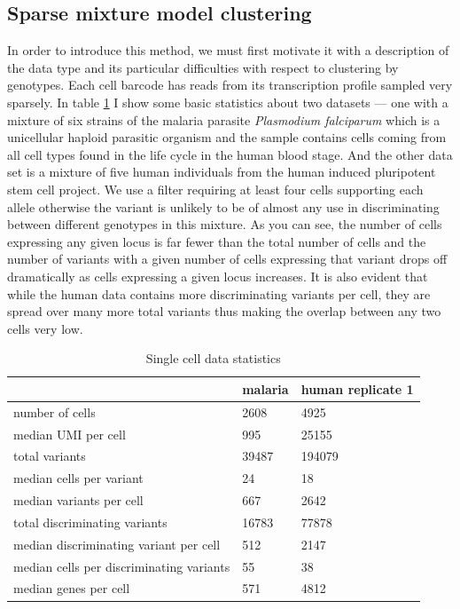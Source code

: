 \subsection{Sparse mixture model clustering}
\par{
In order to introduce this method, we must first motivate it with a description of the data type and its particular difficulties with respect to clustering by genotypes. Each cell barcode has reads from its transcription profile sampled very sparsely. In table \ref{table:scdatatable} I show some basic statistics about two datasets --- one with a mixture of six strains of the malaria parasite \textit{Plasmodium falciparum} which is a unicellular haploid parasitic organism and the sample contains cells coming from all cell types found in the life cycle in the human blood stage. And the other data set is a mixture 
of five human individuals from the human induced pluripotent stem cell project. We use a filter 
requiring at least four cells supporting each allele otherwise the variant is unlikely to be of almost any use in discriminating between different genotypes in this mixture. 
As you can see, the number of cells expressing any given locus is far fewer than the total number of cells and the number of variants with a given number of cells expressing that variant drops off dramatically as cells expressing a given locus increases. It is also evident that while the human data contains more discriminating variants per cell, they are spread over many more total variants thus making the overlap between any two cells very low.
}

\begin{table}[h!]
\caption{Single cell data statistics}
\label{table:scdatatable}
\begin{center}
\begin{tabular}{ | l | l | l | } 
 \hline
  & malaria & human replicate 1 \\ 
  \hline
  number of cells & 2608 & 4925  \\
 \hline
  median UMI per cell & 995 & 25155  \\ 
 \hline
 total variants & 39487 & 194079 \\
 \hline
 median cells per variant & 24 & 18 \\
 \hline
 median variants per cell & 667 & 2642  \\ 
 \hline
 total discriminating variants & 16783 & 77878 \\
  \hline
 median discriminating variant per cell & 512 & 2147 \\
 \hline
 median cells per discriminating variants & 55 & 38 \\
 \hline
 median genes per cell & 571 & 4812 \\
 \hline
 
\end{tabular}
\end{center}
\end{table}

